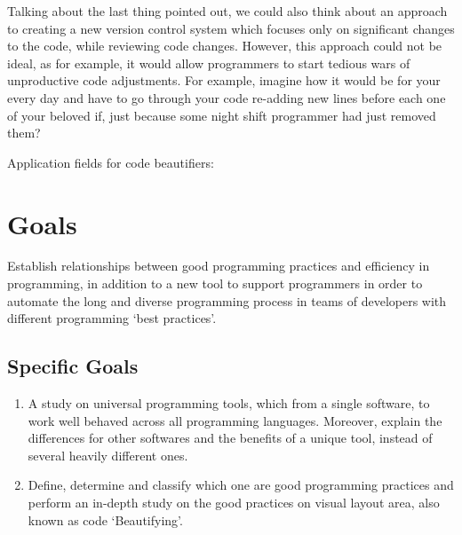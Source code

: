 \begin{englishtext}
    Talking about the last thing pointed out, we could also think about an
    approach to creating a new version control system which focuses only on
    significant changes to the code, while reviewing code changes. However, this
    approach could not be ideal, as for example, it would allow programmers to
    start tedious wars of unproductive code adjustments. For example, imagine
    how it would be for your every day and have to go through your code
    re-adding new lines before each one of your beloved if\s, just because some
    night shift programmer had just removed them?


    Application fields for code beautifiers:
    \cite{annotationAssistant}
    \cite{codePlagiarismDetection}
    \cite{softwarePortfolio}
    \cite{legacyAssets}
    \cite{massMaintenance}
    \cite{prettyPrinting}
    \cite{architectureFormatting}
    \cite{independentFramework}
    \cite{programIndentation}
    \cite{industrialApplication}
    \cite{toolsForProjectManagement}

    \section{Goals}

    Establish relationships between good programming practices and efficiency in
    programming, in addition to a new tool to support programmers in order to
    automate the long and diverse programming process in teams of developers
    with different programming `best practices'. \cite{pushdownAutomata}


    \subsection{Specific Goals}

    \begin{enumerate}
        \item A study on universal programming tools, which from a single
        software, to work well behaved across all programming languages.
        Moreover, explain the differences for other softwares and the benefits
        of a unique tool, instead of several heavily different ones.

        \item Define, determine and classify which one are good programming
        practices and perform an in-depth study on the good practices on visual
        layout area, also known as code `Beautifying'.


\end{enumerate}
\end{englishtext}
